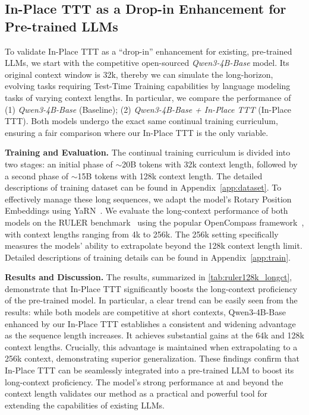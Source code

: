 \subsection{In-Place TTT as a Drop-in Enhancement for Pre-trained LLMs}
\label{sec:exp_continual_pretrain}

To validate In-Place TTT as a ``drop-in'' enhancement for existing, pre-trained LLMs, we start with the competitive open-sourced \textit{Qwen3-4B-Base} model. Its original context window is 32k, thereby we can simulate the long-horizon, evolving tasks requiring Test-Time Training capabilities by language modeling tasks of varying context lengths. In particular, we compare the performance of (1) \textit{Qwen3-4B-Base} (Baseline); (2) \textit{Qwen3-4B-Base + In-Place TTT} (In-Place TTT). Both models undergo the exact same continual training curriculum, ensuring a fair comparison where our In-Place TTT is the only variable.

\textbf{Training and Evaluation.} The continual training curriculum is divided into two stages: an initial phase of $\sim$20B tokens with 32k context length, followed by a second phase of $\sim$15B tokens with 128k context length. The detailed descriptions of training dataset can be found in Appendix~\ref{app:dataset}. To effectively manage these long sequences, we adapt the model's Rotary Position Embeddings using YaRN~\citep{peng2023yarn}. We evaluate the long-context performance of both models on the RULER benchmark~\citep{hsieh2024ruler} using the popular OpenCompass framework~\citep{2023opencompass}, with context lengths ranging from 4k to 256k. The 256k setting specifically measures the models' ability to extrapolate beyond the 128k context length limit. Detailed descriptions of training details can be found in Appendix~\ref{app:train}.

\textbf{Results and Discussion.} The results, summarized in \cref{tab:ruler128k_longct}, demonstrate that In-Place TTT significantly boosts the long-context proficiency of the pre-trained model. In particular, a clear trend can be easily seen from the results: while both models are competitive at short contexts, Qwen3-4B-Base enhanced by our In-Place TTT establishes a consistent and widening advantage as the sequence length increases. It achieves substantial gains at the 64k and 128k context lengths. Crucially, this advantage is maintained when extrapolating to a 256k context, demonstrating superior generalization. These findings confirm that In-Place TTT can be seamlessly integrated into a pre-trained LLM to boost its long-context proficiency. The model's strong performance at and beyond the context length validates our method as a practical and powerful tool for extending the capabilities of existing LLMs.

